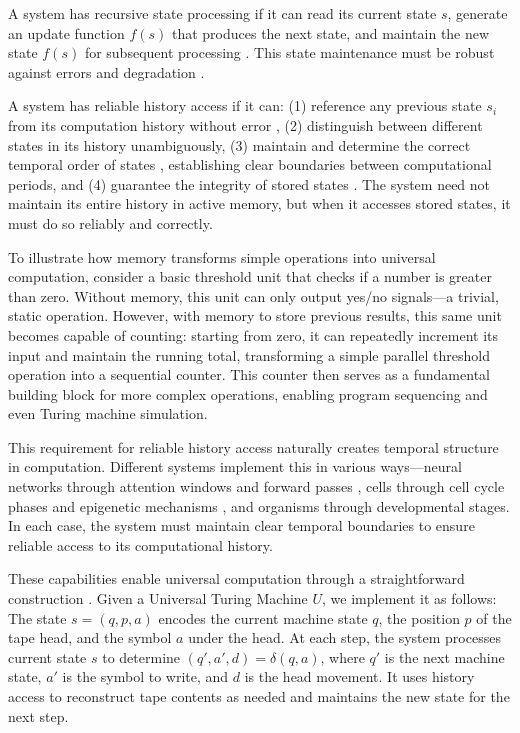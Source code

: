 \documentclass[12pt]{article}
\begin{document}
A system has recursive state processing if it can read its current state $s$, generate an update function $f(s)$ that produces the next state, and maintain the new state $f(s)$ for subsequent processing \cite{manuri2019state}.
This state maintenance must be robust against errors and degradation \cite{yang2013survey}.

A system has reliable history access if it can: (1) reference any previous state $s_i$ from its computation history without error \cite{fu2024memory}, (2) distinguish between different states in its history unambiguously, (3) maintain and determine the correct temporal order of states \cite{berridge2014cell,pastor2020computation}, establishing clear boundaries between computational periods, and (4) guarantee the integrity of stored states \cite{lovkvist2021using}.
The system need not maintain its entire history in active memory, but when it accesses stored states, it must do so reliably and correctly.

To illustrate how memory transforms simple operations into universal computation, consider a basic threshold unit that checks if a number is greater than zero.
Without memory, this unit can only output yes/no signals---a trivial, static operation.
However, with memory to store previous results, this same unit becomes capable of counting: starting from zero, it can repeatedly increment its input and maintain the running total, transforming a simple parallel threshold operation into a sequential counter.
This counter then serves as a fundamental building block for more complex operations, enabling program sequencing and even Turing machine simulation.

This requirement for reliable history access naturally creates temporal structure in computation.
Different systems implement this in various ways---neural networks through attention windows and forward passes \cite{martini2015information,quentin2019differential}, cells through cell cycle phases and epigenetic mechanisms \cite{bruno2022epigenetic}, and organisms through developmental stages.
In each case, the system must maintain clear temporal boundaries to ensure reliable access to its computational history.

These capabilities enable universal computation through a straightforward construction \cite{deutsch1995universality,bennett1989time}.
Given a Universal Turing Machine $U$, we implement it as follows: The state $s = (q, p, a)$ encodes the current machine state $q$, the position $p$ of the tape head, and the symbol $a$ under the head.
At each step, the system processes current state $s$ to determine $(q', a', d) = \delta(q, a)$, where $q'$ is the next machine state, $a'$ is the symbol to write, and $d$ is the head movement.
It uses history access to reconstruct tape contents as needed and maintains the new state for the next step.
\end{document}
